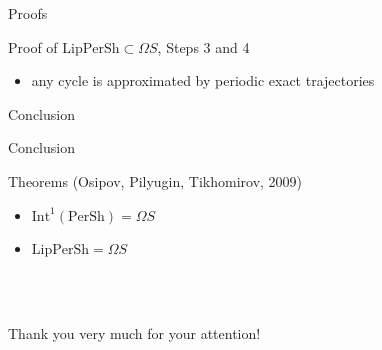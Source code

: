 \documentclass{beamer}
\begin{document}
\begin{section}{Proofs}
\begin{frame}{Proof of $\mbox{LipPerSh}\subset\Omega S$, Steps 3 and 4}
\begin{itemize}
\begin{itemize}
\item any cycle is approximated by periodic exact trajectories
\end{itemize}
\end{itemize}
\end{frame}
\end{section}
\begin{section}{Conclusion}
\begin{frame}{Conclusion}
\begin{block}{Theorems (Osipov, Pilyugin, Tikhomirov, 2009)}
\begin{itemize}
	\item $\mbox{Int}^1(\mbox{PerSh})=\Omega S$
	\item $\mbox{LipPerSh}=\Omega S$
\end{itemize}
\end{block}
\ 
\\

\ 
\\

\begin{center}
Thank you very much for your attention!
\end{center}
\end{frame}
\end{section}
\end{document}

